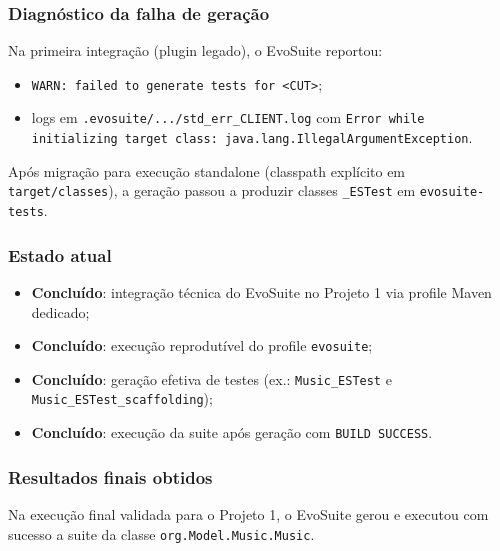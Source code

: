 \documentclass{article}
\begin{document}
\subsubsection{Diagnóstico da falha de geração}
Na primeira integração (plugin legado), o EvoSuite reportou:
\begin{itemize}
    \item \texttt{WARN: failed to generate tests for <CUT>};
    \item logs em \texttt{.evosuite/.../std\_err\_CLIENT.log} com \texttt{Error while initializing target class: java.lang.IllegalArgumentException}.
\end{itemize}

Após migração para execução standalone (classpath explícito em \texttt{target/classes}), a geração passou a produzir classes \texttt{\_ESTest} em \texttt{evosuite-tests}.

\subsubsection{Estado atual}
\begin{itemize}
    \item \textbf{Concluído}: integração técnica do EvoSuite no Projeto 1 via profile Maven dedicado;
    \item \textbf{Concluído}: execução reprodutível do profile \texttt{evosuite};
    \item \textbf{Concluído}: geração efetiva de testes (ex.: \texttt{Music\_ESTest} e \texttt{Music\_ESTest\_scaffolding});
    \item \textbf{Concluído}: execução da suite após geração com \texttt{BUILD SUCCESS}.
\end{itemize}

\subsubsection{Resultados finais obtidos}
Na execução final validada para o Projeto 1, o EvoSuite gerou e executou com sucesso a suite da classe \texttt{org.Model.Music.Music}.
\end{document}
